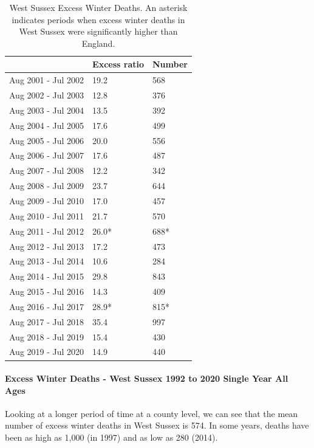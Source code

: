 \begin{table}
    \caption{West Sussex Excess Winter Deaths. An asterisk indicates periods when excess winter deaths in West Sussex were significantly higher than England.}
    \centering
    \begin{tabular}{lll}
        \toprule 
        \ & Excess ratio & Number \\
        \midrule
        Aug 2001 - Jul 2002 & 19.2 & 568 \\
        Aug 2002 - Jul 2003 & 12.8 & 376 \\
        Aug 2003 - Jul 2004 & 13.5 & 392 \\
        Aug 2004 - Jul 2005 & 17.6 & 499 \\
        Aug 2005 - Jul 2006 & 20.0 & 556 \\
        Aug 2006 - Jul 2007 & 17.6 & 487 \\
        Aug 2007 - Jul 2008 & 12.2 & 342 \\
        Aug 2008 - Jul 2009 & 23.7 & 644 \\
        Aug 2009 - Jul 2010 & 17.0 & 457 \\
        Aug 2010 - Jul 2011 & 21.7 & 570 \\
        Aug 2011 - Jul 2012 & 26.0* & 688* \\
        Aug 2012 - Jul 2013 & 17.2 & 473 \\
        Aug 2013 - Jul 2014 & 10.6 & 284 \\
        Aug 2014 - Jul 2015 & 29.8 & 843 \\
        Aug 2015 - Jul 2016 & 14.3 & 409 \\
        Aug 2016 - Jul 2017 & 28.9* & 815* \\
        Aug 2017 - Jul 2018 & 35.4 & 997 \\
        Aug 2018 - Jul 2019 & 15.4 & 430 \\
        Aug 2019 - Jul 2020 & 14.9 & 440 \\
        \bottomrule
    \end{tabular}
    \label{tab:op:exwd}
\end{table}
 
\paragraph{Excess Winter Deaths - West Sussex 1992 to 2020 Single Year All Ages} Looking at a longer period of time at a county level, we can see that the mean number of excess winter deaths in West Sussex is 574. In some years, deaths have been as high as 1,000 (in 1997) and as low as 280 (2014).

